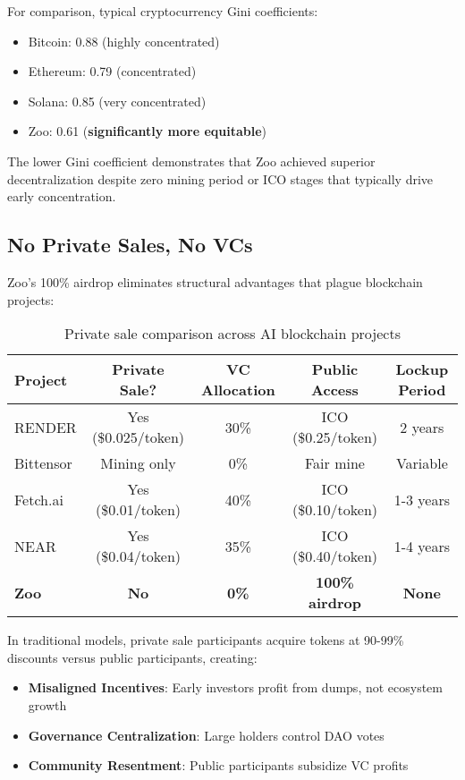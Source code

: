 \documentclass[11pt,letterpaper]{article}
\theoremstyle{definition}
\theoremstyle{remark}
\begin{document}
For comparison, typical cryptocurrency Gini coefficients:
\begin{itemize}
\item Bitcoin: 0.88 (highly concentrated)
\item Ethereum: 0.79 (concentrated)
\item Solana: 0.85 (very concentrated)
\item Zoo: 0.61 (\textbf{significantly more equitable})
\end{itemize}

The lower Gini coefficient demonstrates that Zoo achieved superior decentralization despite zero mining period or ICO stages that typically drive early concentration.

\subsection{No Private Sales, No VCs}

Zoo's 100\% airdrop eliminates structural advantages that plague blockchain projects:

\begin{table}[h]
\centering
\small
\begin{tabular}{lcccc}
\toprule
\textbf{Project} & \textbf{Private Sale?} & \textbf{VC Allocation} & \textbf{Public Access} & \textbf{Lockup Period} \\
\midrule
RENDER & Yes (\$0.025/token) & 30\% & ICO (\$0.25/token) & 2 years \\
Bittensor & Mining only & 0\% & Fair mine & Variable \\
Fetch.ai & Yes (\$0.01/token) & 40\% & ICO (\$0.10/token) & 1-3 years \\
NEAR & Yes (\$0.04/token) & 35\% & ICO (\$0.40/token) & 1-4 years \\
\textbf{Zoo} & \textbf{No} & \textbf{0\%} & \textbf{100\% airdrop} & \textbf{None} \\
\bottomrule
\end{tabular}
\caption{Private sale comparison across AI blockchain projects}
\label{tab:private_sales}
\end{table}

In traditional models, private sale participants acquire tokens at 90-99\% discounts versus public participants, creating:
\begin{itemize}
\item \textbf{Misaligned Incentives}: Early investors profit from dumps, not ecosystem growth
\item \textbf{Governance Centralization}: Large holders control DAO votes
\item \textbf{Community Resentment}: Public participants subsidize VC profits
\end{itemize}
\end{document}
